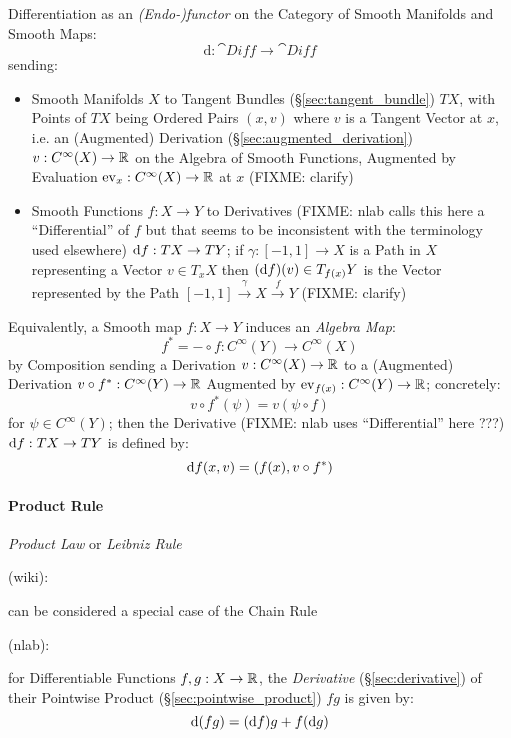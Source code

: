 Differentiation as an \emph{(Endo-)functor} on the Category of Smooth Manifolds
and Smooth Maps:
\[
  \mathrm{d} : \cat{Diff} \rightarrow \cat{Diff}
\]
sending:
\begin{itemize}
  \item Smooth Manifolds $X$ to Tangent Bundles (\S\ref{sec:tangent_bundle}) $T
    X$, with Points of $T X$ being Ordered Pairs $(x, v)$ where $v$ is a Tangent
    Vector at $x$, i.e. an (Augmented) Derivation
    (\S\ref{sec:augmented_derivation}) $v : C^\infty(X) \rightarrow \mathbb{R}$ on
    the Algebra of Smooth Functions, Augmented by Evaluation $\mathrm{ev}_x :
    C^\infty(X) \rightarrow \mathbb{R}$ at $x$ (FIXME: clarify)
  \item Smooth Functions $f : X \rightarrow Y$ to Derivatives (FIXME: nlab calls
    this here a ``Differential'' of $f$ but that seems to be inconsistent with
    the terminology used elsewhere) $\mathrm{d}f : TX \rightarrow TY$; if $\gamma
    : [-1,1] \rightarrow X$ is a Path in $X$ representing a Vector
    $v \in T_x{X}$ then $(\mathrm{d}f)(v) \in T_{f(x)}Y$ is the Vector represented
    by the Path $[-1, 1] \xrightarrow{\gamma} X \xrightarrow{f} Y$
    (FIXME: clarify)
\end{itemize}
Equivalently, a Smooth map $f : X \rightarrow Y$ induces an \emph{Algebra Map}:
\[
  f^* = - \circ f : C^\infty(Y) \rightarrow C^\infty(X)
\]
by Composition sending a Derivation $v : C^\infty(X) \rightarrow \mathbb{R}$ to a
(Augmented) Derivation $v \circ f^* : C^\infty(Y) \rightarrow \mathbb{R}$ Augmented
by $\mathrm{ev}_{f(x)} : C^\infty(Y) \rightarrow \mathbb{R}$; concretely:
\[
  v \circ f^*(\psi) = v(\psi \circ f)
\]
for $\psi \in C^\infty(Y)$; then the Derivative (FIXME: nlab uses
``Differential'' here ???) $\mathrm{d}f : T X \rightarrow T Y$ is defined by:
\[
  \mathrm{d}f(x,v) = (f(x), v \circ f^*)
\]



\paragraph{Product Rule}\label{sec:product_rule}\hfill

\emph{Product Law} or \emph{Leibniz Rule}

(wiki):

can be considered a special case of the Chain Rule

(nlab):

for Differentiable Functions $f, g : X \rightarrow \mathbb{R}$, the
\emph{Derivative} (\S\ref{sec:derivative}) of their Pointwise Product
(\S\ref{sec:pointwise_product}) $fg$ is given by:
\[
  \mathrm{d}(fg) = (\mathrm{d}f)g + f(\mathrm{d}g)
\]


